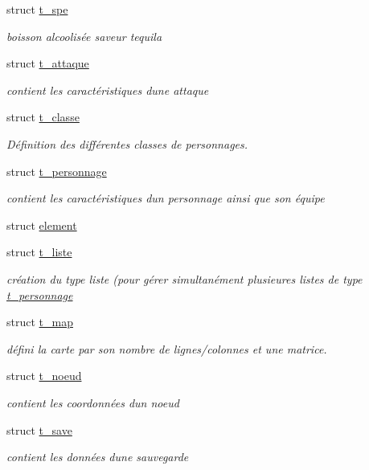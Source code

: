 \begin{DoxyCompactItemize}
\item 
struct \hyperlink{a00011}{t\+\_\+spe}
\begin{DoxyCompactList}\small\item\em boisson alcoolisée saveur tequila \end{DoxyCompactList}\item 
struct \hyperlink{a00003}{t\+\_\+attaque}
\begin{DoxyCompactList}\small\item\em contient les caractéristiques d\textquotesingle{}une attaque \end{DoxyCompactList}\item 
struct \hyperlink{a00004}{t\+\_\+classe}
\begin{DoxyCompactList}\small\item\em Définition des différentes classes de personnages. \end{DoxyCompactList}\item 
struct \hyperlink{a00009}{t\+\_\+personnage}
\begin{DoxyCompactList}\small\item\em contient les caractéristiques d\textquotesingle{}un personnage ainsi que son équipe \end{DoxyCompactList}\item 
struct \hyperlink{a00002}{element}
\item 
struct \hyperlink{a00006}{t\+\_\+liste}
\begin{DoxyCompactList}\small\item\em création du type liste (pour gérer simultanément plusieures listes de type \hyperlink{a00009}{t\+\_\+personnage} \end{DoxyCompactList}\item 
struct \hyperlink{a00007}{t\+\_\+map}
\begin{DoxyCompactList}\small\item\em défini la carte par son nombre de lignes/colonnes et une matrice. \end{DoxyCompactList}\item 
struct \hyperlink{a00008}{t\+\_\+noeud}
\begin{DoxyCompactList}\small\item\em contient les coordonnées d\textquotesingle{}un noeud \end{DoxyCompactList}\item 
struct \hyperlink{a00010}{t\+\_\+save}
\begin{DoxyCompactList}\small\item\em contient les données d\textquotesingle{}une sauvegarde \end{DoxyCompactList}\end{DoxyCompactItemize}
